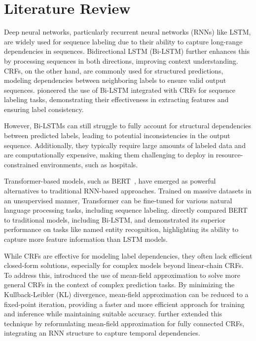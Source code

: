 \documentclass[12pt]{article}
\begin{document}
\section{Literature Review}


Deep neural networks, particularly recurrent neural networks (RNNs) like LSTM,
are widely used for sequence labeling due to their ability to capture
long-range dependencies in sequences. Bidirectional LSTM (Bi-LSTM) further
enhances this by processing sequences in both directions, improving context
understanding.
CRFs, on the other hand, are commonly used for structured predictions,
modeling dependencies between neighboring labels to ensure valid output
sequences.
\citet{huang2015bidirectional} pioneered the use of Bi-LSTM integrated with
CRFs for sequence labeling tasks, demonstrating their effectiveness in
extracting features and ensuring label consistency.


However, Bi-LSTMs can still struggle to fully account for structural
dependencies between predicted labels, leading to potential inconsistencies in
the output sequence. Additionally, they typically require large amounts of
labeled data and are computationally expensive, making them challenging to
deploy in resource-constrained environments, such as hospitals.


Transformer-based models, such as BERT~\citep{devlin2019bert},
have emerged as powerful alternatives to traditional RNN-based approaches.
Trained on massive datasets in an unsupervised manner, Transformer can be
fine-tuned for various natural language processing tasks,
including sequence labeling.
\citet{devlin2019bert} directly compared BERT to traditional models, including
Bi-LSTM, and demonstrated its superior performance on tasks like named entity
recognition, highlighting its ability to capture more feature information
than LSTM models.


While CRFs are effective for modeling label dependencies, they often lack
efficient closed-form solutions, especially for complex models beyond
linear-chain CRFs. To address this, \citet{krahenbuhl2011efficient} introduced
the use of mean-field approximation to solve more general CRFs in the context
of complex prediction tasks. By minimizing the Kullback-Leibler (KL)
divergence, mean-field approximation can be reduced to a fixed-point iteration,
providing a faster and more efficient approach for training and inference
while maintaining suitable accuracy. \citet{zheng2015conditional} further
extended this technique by reformulating mean-field approximation for fully
connected CRFs, integrating an RNN structure to capture temporal dependencies.
\end{document}
